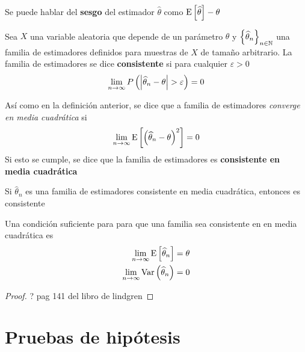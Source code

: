 Se puede hablar del \textbf{sesgo} del estimador $\widehat{\theta}$ como $\mathrm{E}\left[ \widehat{\theta} \right]-\theta$

\begin{definicion}
Sea $X$ una variable aleatoria que depende de un parámetro $\theta$ y $\left\{ \widehat{\theta}_n \right\}_{n\in \mathbb{N}}$ una familia de estimadores definidos para muestras de $X$ de tamaño arbitrario. La familia de estimadores se dice \textbf{consistente} si para cualquier $\varepsilon > 0$
\begin{equation}
\lim_{n\rightarrow\infty} P\left( \left| \widehat{\theta}_n-\theta \right| > \varepsilon \right) = 0
\end{equation}
\end{definicion}

\begin{definicion}
Así como en la definición anterior, se dice que a familia de estimadores \textit{converge en media cuadrática} si
\begin{equation}
\lim_{n\rightarrow\infty} \mathrm{E}\left[ \left( \widehat{\theta}_n - \theta \right)^{2} \right] = 0
\end{equation}
Si esto se cumple, se dice que la familia de estimadores es \textbf{consistente en media cuadrática} \end{definicion}

\begin{teorema}
Si $\widehat{\theta}_n$ es una familia de estimadores consistente en media cuadrática, entonces es consistente
\end{teorema}

\begin{teorema}
Una condición suficiente para para que una familia sea consistente en en media cuadrática es
\begin{align}
\lim_{n\rightarrow\infty} \mathrm{E}\left[ \widehat{\theta}_n \right] &= \theta \\
\lim_{n\rightarrow\infty} \mathrm{Var}\left( \widehat{\theta}_n \right) &= 0
\end{align}
\end{teorema}

\begin{proof}
? pag 141 del libro de lindgren
\end{proof}




\section{Pruebas de hipótesis}

